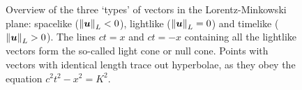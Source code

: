\begin{figure}[ht]
    \centering
    
    \caption{Overview of the three `types' of vectors in the Lorentz-Minkowski plane: spacelike (\(\norm{\vb*{u}}_L < 0\)), lightlike (\(\norm{\vb*{u}}_L = 0\)) and timelike (\(\norm{\vb*{u}}_L > 0\)). The lines \(ct = x\) and \(ct = -x\) containing all the lightlike vectors form the so-called light cone or null cone. Points with vectors with identical length trace out hyperbolae, as they obey the equation $c^2t^2 - x^2 = K^2$.} %
    \label{fig:lightlike_spacelike}
\end{figure}


